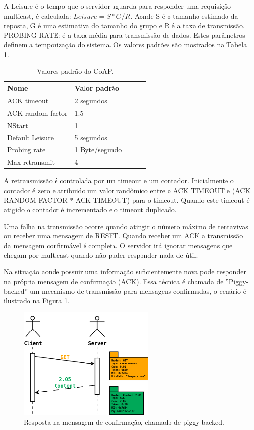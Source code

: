 A Leisure \'e o tempo que o servidor aguarda para responder uma requisi\c{c}\~ao multicast, \'e calculada: $Leisure = S * G / R$. Aonde S \'e o tamanho estimado da reposta, G \'e uma estimativa do tamanho do grupo e R \'e a taxa de transmiss\~ao. PROBING RATE: \'e a taxa m\'edia para transmiss\~ao de dados. Estes par\^ametros definem a temporiza\c{c}\~ao do sistema. Os valores padr\~oes s\~ao mostrados na Tabela \ref{coapDefault}.
\begin{table}[h]
\label{coapDefault}
\centering
\begin{tabular}{@{}lllll@{}}
\toprule
Nome & Valor padr\~ao & \\ \midrule
ACK timeout & 2 segundos & \\
ACK random factor & 1.5 & \\
NStart & 1 & \\
Default Leisure & 5 segundos & \\
Probing rate & 1 Byte/segundo & \\
Max retransmit & 4 &  \\ \midrule
\end{tabular}
\caption{Valores padr\~ao do CoAP.}
\end{table}

A retransmiss\~ao \'e controlada por um timeout e um contador. Inicialmente o contador \'e zero e atribuido um valor rand\^omico entre o ACK TIMEOUT e (ACK RANDOM FACTOR * ACK TIMEOUT) para o timeout. Quando este timeout \'e atigido o contador \'e incrementado e o timeout duplicado.

Uma falha na transmiss\~ao ocorre quando atingir o n\'umero m\'aximo de tentavivas ou receber uma mensagem de RESET. Quando receber um ACK a transmiss\~ao da mensagem confirm\'avel \'e completa. O servidor ir\'a ignorar mensagens que chegam por multicast quando n\~ao puder responder nada de \'util.

Na situa\c{c}\~ao aonde possuir uma informa\c{c}\~ao suficientemente nova pode responder na pr\'opria mensagem de confirma\c{c}\~ao (ACK). Essa t\'ecnica \'e chamada de ''Piggy-backed'' um mecanismo de transmiss\~ao para mensagens confirmadas, o cen\'ario \'e ilustrado na Figura \ref{piggyBacked}\cite{draft-ietf-core-coap-18}.
\begin{figure}[H]
   \label{piggyBacked}
   \centering
   \includegraphics[width=0.6\textwidth]{figuras/piggybacked.png}
   \caption{Resposta na mensagem de confirma\c{c}\~ao, chamado de piggy-backed.}
\end{figure}

